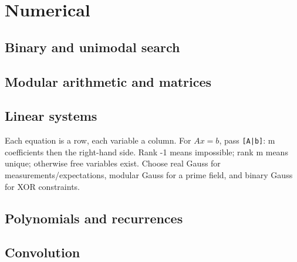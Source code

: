 \chapter{Numerical}
\section{Binary and unimodal search}
\section{Modular arithmetic and matrices}
\section{Linear systems}
Each equation is a row, each variable a column. For $Ax=b$, pass
\texttt{[A|b]}: m coefficients then the right-hand side.
Rank -1 means impossible; rank m means unique; otherwise free variables exist.
Choose real Gauss for measurements/expectations, modular Gauss for a prime field,
and binary Gauss for XOR constraints.
\section{Polynomials and recurrences}
\section{Convolution}
\par
